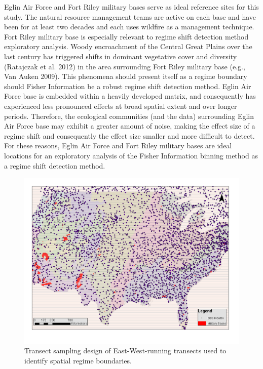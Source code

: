 \documentclass[12pt,twoside]{reedthesis}
\begin{document}
Eglin Air Force and Fort Riley military bases serve as ideal reference
sites for this study. The natural resource management teams are active
on each base and have been for at least two decades and each uses
wildfire as a management technique. Fort Riley military base is
especially relevant to regime shift detection method exploratory
analysis. Woody encroachment of the Central Great Plains over the last
century has triggered shifts in dominant vegetative cover and diversity
(Ratajczak et al. 2012) in the area surrounding Fort Riley military base
(e.g., Van Auken 2009). This phenomena should present itself as a regime
boundary should Fisher Information be a robust regime shift detection
method. Eglin Air Force base is embedded within a heavily developed
matrix, and consequently has experienced less pronounced effects at
broad spatial extent and over longer periods. Therefore, the ecological
communities (and the data) surrounding Eglin Air Force base may exhibit
a greater amount of noise, making the effect size of a regime shift and
consequently the effect size smaller and more difficult to detect. For
these reasons, Eglin Air Force and Fort Riley military bases are ideal
locations for an exploratory analysis of the Fisher Information binning
method as a regime shift detection method.
\begin{figure}

{\centering \includegraphics{chapterFiles/binningChap/figures/bbsPoints} 

}

\caption{Transect sampling design of East-West-running transects used to identify spatial regime boundaries.}\label{fig:bbsPoints}
\end{figure}
\end{document}
